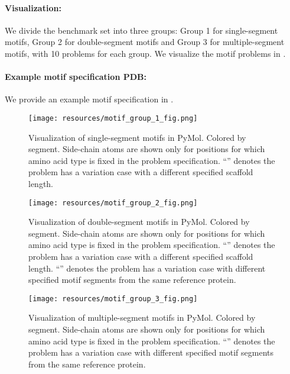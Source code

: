 \paragraph{Visualization:} We divide the benchmark set into three groups: Group 1 for single-segment motifs, Group 2 for double-segment motifs and Group 3 for multiple-segment motifs, with 10 problems for each group. We visualize the motif problems in .

\paragraph{Example motif specification PDB:}  We provide an example motif specification in .


\clearpage %
\pagebreak

{
\begin{figure}[ht]
    \centering
    \texttt{[image: resources/motif\_group\_1\_fig.png]} %
    \caption{Visualization of single-segment motifs in PyMol.  Colored by segment.  Side-chain atoms are shown only for positions for which amino acid type is fixed in the problem specification. ``\dag''  denotes the problem has a variation case with a different specified scaffold length.}
    \label{fig:group_1_problems} %
\end{figure}
}

\clearpage %
\pagebreak

{
\begin{figure}[ht]
    \centering
    \texttt{[image: resources/motif\_group\_2\_fig.png]} %
    \caption{Visualization of double-segment motifs in PyMol. Colored by segment.  Side-chain atoms are shown only for positions for which amino acid type is fixed in the problem specification. ``\dag''  denotes the problem has a variation case with a different specified scaffold length. ``\ddag'' denotes the problem has a variation case with different specified motif segments from the same reference protein.}
    \label{fig:group_2_problems} %
\end{figure}
}

\clearpage %
\pagebreak

{
\begin{figure}[ht]
    \centering
    \texttt{[image: resources/motif\_group\_3\_fig.png]} %
    \caption{Visualization of multiple-segment motifs in PyMol. Colored by segment.  Side-chain atoms are shown only for positions for which amino acid type is fixed in the problem specification. ``\ddag'' denotes the problem has a variation case with different specified motif segments from the same reference protein.}
    \label{fig:group_3_problems} %
\end{figure}
}

\clearpage %
\pagebreak

{

}
\clearpage %
\pagebreak
